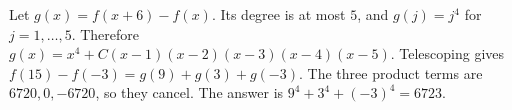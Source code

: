 Let $g(x)=f(x+6)-f(x)$. Its degree is at most $5$, and $g(j)=j^4$ for $j=1,\ldots,5$. Therefore $g(x)=x^4+C(x-1)(x-2)(x-3)(x-4)(x-5)$. Telescoping gives $f(15)-f(-3)=g(9)+g(3)+g(-3)$. The three product terms are $6720,0,-6720$, so they cancel. The answer is $9^4+3^4+(-3)^4=\boxed{6723}$.

